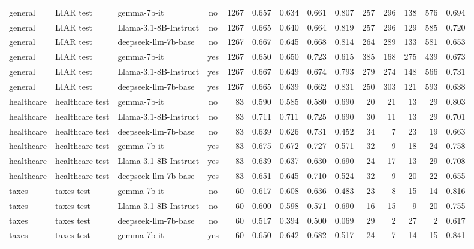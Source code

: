 \begin{landscape}
\begin{longtable}{@{}l l p{3.6cm} c r r r r r r r r r r@{}}
general    & LIAR test       & gemma-7b-it           & no  & 1267 & 0.657 & 0.634 & 0.661 & 0.807 & 257 & 296 & 138 & 576 & 0.694 \\
general    & LIAR test       & Llama-3.1-8B-Instruct & no  & 1267 & 0.665 & 0.640 & 0.664 & 0.819 & 257 & 296 & 129 & 585 & 0.720 \\
general    & LIAR test       & deepseek-llm-7b-base  & no  & 1267 & 0.667 & 0.645 & 0.668 & 0.814 & 264 & 289 & 133 & 581 & 0.653 \\
general    & LIAR test       & gemma-7b-it           & yes & 1267 & 0.650 & 0.650 & 0.723 & 0.615 & 385 & 168 & 275 & 439 & 0.673 \\
general    & LIAR test       & Llama-3.1-8B-Instruct & yes & 1267 & 0.667 & 0.649 & 0.674 & 0.793 & 279 & 274 & 148 & 566 & 0.731 \\
general    & LIAR test       & deepseek-llm-7b-base  & yes & 1267 & 0.665 & 0.639 & 0.662 & 0.831 & 250 & 303 & 121 & 593 & 0.638 \\
healthcare & healthcare test & gemma-7b-it           & no  &   83 & 0.590 & 0.585 & 0.580 & 0.690 &  20 &  21 &  13 &  29 & 0.803 \\
healthcare & healthcare test & Llama-3.1-8B-Instruct & no  &   83 & 0.711 & 0.711 & 0.725 & 0.690 &  30 &  11 &  13 &  29 & 0.701 \\
healthcare & healthcare test & deepseek-llm-7b-base  & no  &   83 & 0.639 & 0.626 & 0.731 & 0.452 &  34 &   7 &  23 &  19 & 0.663 \\
healthcare & healthcare test & gemma-7b-it           & yes &   83 & 0.675 & 0.672 & 0.727 & 0.571 &  32 &   9 &  18 &  24 & 0.758 \\
healthcare & healthcare test & Llama-3.1-8B-Instruct & yes &   83 & 0.639 & 0.637 & 0.630 & 0.690 &  24 &  17 &  13 &  29 & 0.708 \\
healthcare & healthcare test & deepseek-llm-7b-base  & yes &   83 & 0.651 & 0.645 & 0.710 & 0.524 &  32 &   9 &  20 &  22 & 0.655 \\
taxes      & taxes test      & gemma-7b-it           & no  &   60 & 0.617 & 0.608 & 0.636 & 0.483 &  23 &   8 &  15 &  14 & 0.816 \\
taxes      & taxes test      & Llama-3.1-8B-Instruct & no  &   60 & 0.600 & 0.598 & 0.571 & 0.690 &  16 &  15 &   9 &  20 & 0.755 \\
taxes      & taxes test      & deepseek-llm-7b-base  & no  &   60 & 0.517 & 0.394 & 0.500 & 0.069 &  29 &   2 &  27 &   2 & 0.617 \\
taxes      & taxes test      & gemma-7b-it           & yes &   60 & 0.650 & 0.642 & 0.682 & 0.517 &  24 &   7 &  14 &  15 & 0.841 \\

\end{longtable}
\end{landscape}
